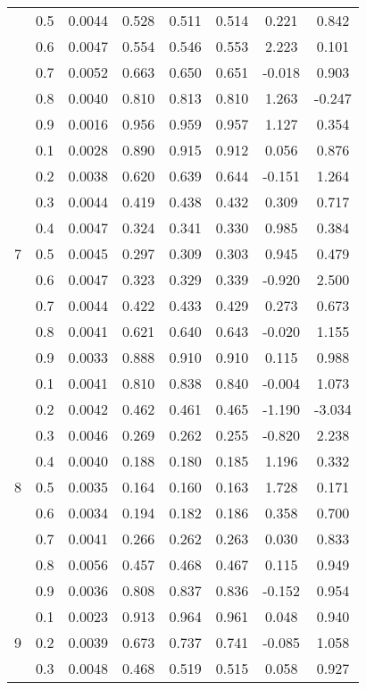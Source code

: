\documentclass[11pt,a4paper]{report}
\begin{document}
\begin{longtable}{ | c | c || c | c | c | c | c | c | }
 & 0.5 & 0.0044 & 0.528 & 0.511 & 0.514 & 0.221 & 0.842 \\
 & 0.6 & 0.0047 & 0.554 & 0.546 & 0.553 & 2.223 & 0.101 \\
 & 0.7 & 0.0052 & 0.663 & 0.650 & 0.651 & -0.018 & 0.903 \\
 & 0.8 & 0.0040 & 0.810 & 0.813 & 0.810 & 1.263 & -0.247 \\
 & 0.9 & 0.0016 & 0.956 & 0.959 & 0.957 & 1.127 & 0.354 \\
 \hline
\multirow{9}{*}{7} & 0.1 & 0.0028 & 0.890 & 0.915 & 0.912 & 0.056 & 0.876 \\
 & 0.2 & 0.0038 & 0.620 & 0.639 & 0.644 & -0.151 & 1.264 \\
 & 0.3 & 0.0044 & 0.419 & 0.438 & 0.432 & 0.309 & 0.717 \\
 & 0.4 & 0.0047 & 0.324 & 0.341 & 0.330 & 0.985 & 0.384 \\
 & 0.5 & 0.0045 & 0.297 & 0.309 & 0.303 & 0.945 & 0.479 \\
 & 0.6 & 0.0047 & 0.323 & 0.329 & 0.339 & -0.920 & 2.500 \\
 & 0.7 & 0.0044 & 0.422 & 0.433 & 0.429 & 0.273 & 0.673 \\
 & 0.8 & 0.0041 & 0.621 & 0.640 & 0.643 & -0.020 & 1.155 \\
 & 0.9 & 0.0033 & 0.888 & 0.910 & 0.910 & 0.115 & 0.988 \\
 \hline
\multirow{9}{*}{8} & 0.1 & 0.0041 & 0.810 & 0.838 & 0.840 & -0.004 & 1.073 \\
 & 0.2 & 0.0042 & 0.462 & 0.461 & 0.465 & -1.190 & -3.034 \\
 & 0.3 & 0.0046 & 0.269 & 0.262 & 0.255 & -0.820 & 2.238 \\
 & 0.4 & 0.0040 & 0.188 & 0.180 & 0.185 & 1.196 & 0.332 \\
 & 0.5 & 0.0035 & 0.164 & 0.160 & 0.163 & 1.728 & 0.171 \\
 & 0.6 & 0.0034 & 0.194 & 0.182 & 0.186 & 0.358 & 0.700 \\
 & 0.7 & 0.0041 & 0.266 & 0.262 & 0.263 & 0.030 & 0.833 \\
 & 0.8 & 0.0056 & 0.457 & 0.468 & 0.467 & 0.115 & 0.949 \\
 & 0.9 & 0.0036 & 0.808 & 0.837 & 0.836 & -0.152 & 0.954 \\
 \hline
\multirow{9}{*}{9} & 0.1 & 0.0023 & 0.913 & 0.964 & 0.961 & 0.048 & 0.940 \\
 & 0.2 & 0.0039 & 0.673 & 0.737 & 0.741 & -0.085 & 1.058 \\
 & 0.3 & 0.0048 & 0.468 & 0.519 & 0.515 & 0.058 & 0.927 \\

\end{longtable}
\end{document}
